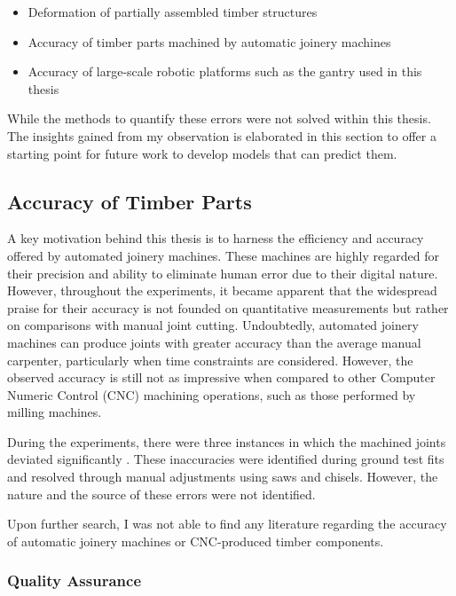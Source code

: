 \begin{itemize}[nosep]
	\item Deformation of partially assembled timber structures
	\item Accuracy of timber parts machined by automatic joinery machines
	\item Accuracy of large-scale robotic platforms such as the gantry used in this thesis
\end{itemize}

While the methods to quantify these errors were not solved within this thesis. The insights gained from my observation is elaborated in this section to offer a starting point for future work to develop models that can predict them. 

\subsection{Accuracy of Timber Parts}
\label{subsection:new-hypo-accuracy-of-timber-parts}

A key motivation behind this thesis is to harness the efficiency and accuracy offered by automated joinery machines. These machines are highly regarded for their precision and ability to eliminate human error due to their digital nature. However, throughout the experiments, it became apparent that the widespread praise for their accuracy is not founded on quantitative measurements but rather on comparisons with manual joint cutting. Undoubtedly, automated joinery machines can produce joints with greater accuracy than the average manual carpenter, particularly when time constraints are considered. However, the observed accuracy is still not as impressive when compared to other Computer Numeric Control (CNC) machining operations, such as those performed by milling machines.

During the experiments, there were three instances in which the machined joints deviated significantly . These inaccuracies were identified during ground test fits and resolved through manual adjustments using saws and chisels. However, the nature and the source of these errors were not identified. 

Upon further search, I was not able to find any literature regarding the accuracy of automatic joinery machines or CNC-produced timber components.

\subsubsection{Quality Assurance}
\label{subsubsection:new-hypo-quality-assurance}

